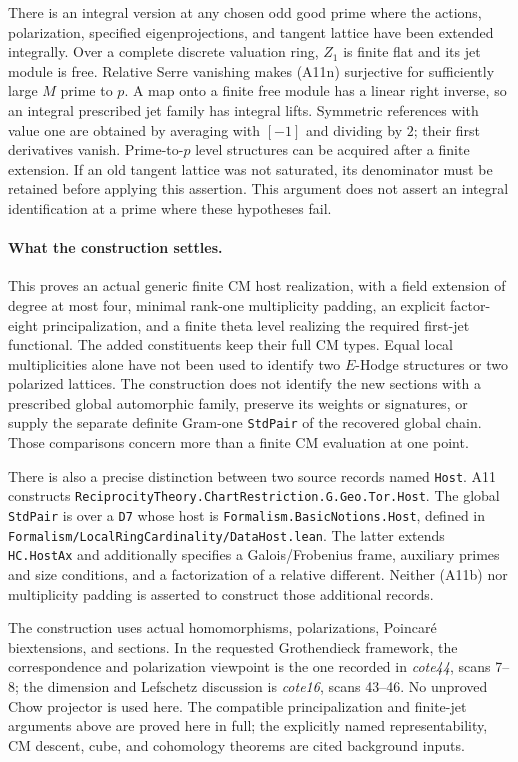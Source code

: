 There is an integral version at any chosen odd good prime
where the actions, polarization, specified eigenprojections,
and tangent lattice have been extended integrally.  Over a
complete discrete valuation ring, $Z_1$ is finite flat and its
jet module is free.  Relative Serre vanishing makes (A11n)
surjective for sufficiently large $M$ prime to $p$.  A map
onto a finite free module has a linear right inverse, so an
integral prescribed jet family has integral lifts.  Symmetric
references with value one are obtained by averaging with
$[-1]$ and dividing by $2$; their first derivatives vanish.
Prime-to-$p$ level structures can be acquired after a finite
extension.  If an old tangent lattice was not saturated, its
denominator must be retained before applying this assertion.
This argument does not assert an integral identification at a
prime where these hypotheses fail.

\paragraph{What the construction settles.}
This proves an actual generic finite CM host realization,
with a field extension of degree at most four, minimal
rank-one multiplicity padding, an explicit factor-eight
principalization, and a finite theta level realizing the
required first-jet functional.  The added constituents keep
their full CM types.  Equal local multiplicities alone have
not been used to identify two $E$-Hodge structures or two
polarized lattices.  The construction does not identify the
new sections with a prescribed global automorphic family,
preserve its weights or signatures, or supply the separate
definite Gram-one \texttt{StdPair} of the recovered global
chain.  Those comparisons concern more than a finite CM
evaluation at one point.

There is also a precise distinction between two source records
named \texttt{Host}.  A11 constructs
\texttt{ReciprocityTheory.ChartRestriction.G.Geo.Tor.Host}.
The global \texttt{StdPair} is over a \texttt{D7} whose host is
\texttt{Formalism.BasicNotions.Host}, defined in
\texttt{Formalism/LocalRingCardinality/DataHost.lean}.
The latter extends \texttt{HC.HostAx} and additionally
specifies a Galois/Frobenius frame, auxiliary primes and
size conditions, and a factorization of a relative different.
Neither (A11b) nor multiplicity padding is asserted to
construct those additional records.

The construction uses actual homomorphisms, polarizations,
Poincar\'e biextensions, and sections.  In the requested
Grothendieck framework, the correspondence and polarization
viewpoint is the one recorded in \emph{cote44}, scans 7--8;
the dimension and Lefschetz discussion is \emph{cote16}, scans
43--46.  No unproved Chow projector is used here.  The
compatible principalization and finite-jet arguments above
are proved here in full; the explicitly named representability, CM descent,
cube, and cohomology theorems are cited background inputs.
